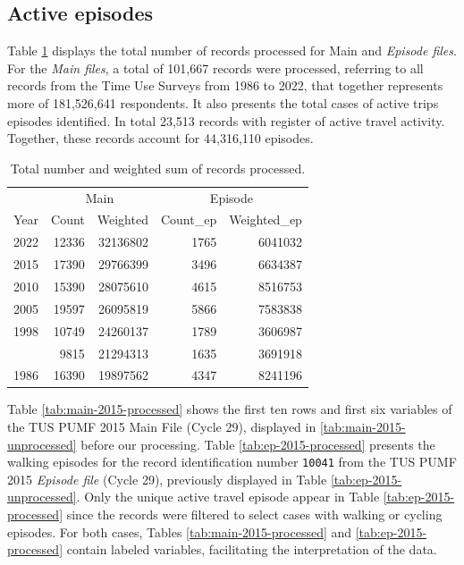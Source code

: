 \documentclass[Royal,times,sageh]{sagej}
\begin{document}
\subsection{Active episodes}\label{active-episodes}

Table \ref{tab:processed-obs} displays the total number of records
processed for Main and \emph{Episode files}. For the \emph{Main files},
a total of 101,667 records were processed, referring to all records from
the Time Use Surveys from 1986 to 2022, that together represents more of
181,526,641 respondents. It also presents the total cases of active
trips episodes identified. In total 23,513 records with register of
active travel activity. Together, these records account for 44,316,110
episodes.

\begingroup\fontsize{8}{10}\selectfont

\begin{longtable}[t]{rr>{}r|rr}
\caption{\label{tab:table_df_processed}\label{tab:processed-obs}Total number and weighted sum of records processed.}\\
\toprule
\multicolumn{1}{c}{ } & \multicolumn{2}{c}{Main} & \multicolumn{2}{c}{Episode} \\
\cmidrule(l{3pt}r{3pt}){2-3} \cmidrule(l{3pt}r{3pt}){4-5}
Year & Count & Weighted & Count\_ep & Weighted\_ep\\
\midrule
2022 & 12336 & 32136802 & 1765 & 6041032\\
2015 & 17390 & 29766399 & 3496 & 6634387\\
2010 & 15390 & 28075610 & 4615 & 8516753\\
2005 & 19597 & 26095819 & 5866 & 7583838\\
1998 & 10749 & 24260137 & 1789 & 3606987\\
\addlinespace
1992 & 9815 & 21294313 & 1635 & 3691918\\
1986 & 16390 & 19897562 & 4347 & 8241196\\
\bottomrule
\end{longtable}
\endgroup{}

Table \ref{tab:main-2015-processed} shows the first ten rows and first
six variables of the TUS PUMF 2015 Main File (Cycle 29), displayed in
\ref{tab:main-2015-unprocessed} before our processing. Table
\ref{tab:ep-2015-processed} presents the walking episodes for the record
identification number \texttt{10041} from the TUS PUMF 2015
\emph{Episode file} (Cycle 29), previously displayed in Table
\ref{tab:ep-2015-unprocessed}. Only the unique active travel episode
appear in Table \ref{tab:ep-2015-processed} since the records were
filtered to select cases with walking or cycling episodes. For both
cases, Tables \ref{tab:main-2015-processed} and
\ref{tab:ep-2015-processed} contain labeled variables, facilitating the
interpretation of the data.
\end{document}
